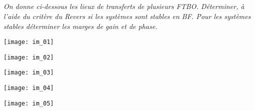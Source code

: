 \ifprof
\else
\begin{multicols}{2}
\fi
\subparagraph{}\textit{On donne ci-dessous les lieux de transferts de plusieurs  FTBO. Déterminer, à l’aide du critère du Revers si les systèmes sont stables en BF. Pour les systèmes stables déterminer les marges de gain et de phase.}
 
 
\begin{center}
\texttt{[image: im\_01]}
\end{center}

\begin{center}
\texttt{[image: im\_02]}
\end{center}

\begin{center}
\texttt{[image: im\_03]}
\end{center}

\begin{center}
\texttt{[image: im\_04]}
\end{center}

\begin{center}
\texttt{[image: im\_05]}
\end{center}


\end{multicols}


